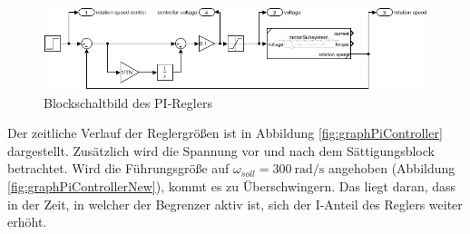 \documentclass[
    paper=a4,
    fontsize=10pt,
    DIV=12,
    oneside,
]{scrartcl}
\begin{document}
    \begin{figure}[hbt]
        \centering
        \includegraphics[width=1.5\imagewidth]{../versuch3/blockPiController}
        \caption{Blockschaltbild des PI-Reglers}
        \label{fig:blockPiController}
    \end{figure}   

    Der zeitliche Verlauf der Reglergrößen ist in Abbildung \ref{fig:graphPiController} dargestellt. Zusätzlich wird die Spannung vor und nach dem Sättigungsblock betrachtet. Wird die Führungsgröße auf \(\omega_{soll} = \SI{300}{\radian\per\second}\) angehoben (Abbildung \ref{fig:graphPiControllerNew}), kommt es zu Überschwingern. Das liegt daran, dass in der Zeit, in welcher der Begrenzer aktiv ist, sich der I-Anteil des Reglers weiter erhöht. 
\end{document}
